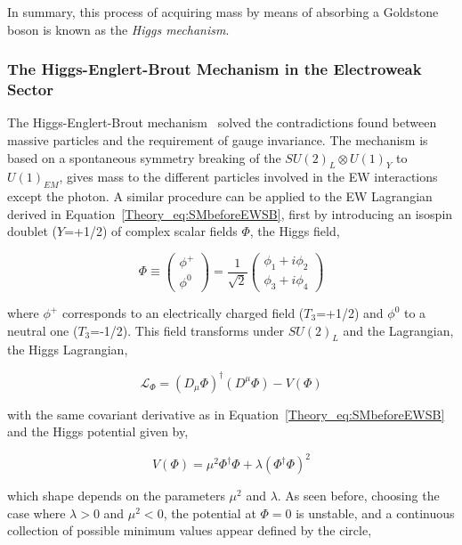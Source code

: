 In summary, this process of acquiring mass by means of absorbing a Goldstone boson is known as the \textit{Higgs mechanism}.

\subsubsection{The Higgs-Englert-Brout Mechanism in the Electroweak Sector}

The Higgs-Englert-Brout mechanism~\cite{Higgs1,Higgs2,Englert} solved the contradictions found between massive particles and
the requirement of gauge invariance. The mechanism is based on a spontaneous symmetry breaking of the $SU(2)_L\otimes U(1)_Y$ to $U(1)_{EM}$,
gives mass to the different particles involved in the \acrshort{EW} interactions except the photon.
A similar procedure can be applied to the EW Lagrangian derived in Equation~\ref{Theory_eq:SMbeforeEWSB},
first by introducing an isospin doublet ($Y$=+1/2) of complex scalar fields $\Phi$, the Higgs field,

\begin{equation}
    \Phi\equiv
    \begin{pmatrix} \phi^+ \\ \phi^0 \end{pmatrix}
    =\frac{1}{\sqrt{2}}
    \begin{pmatrix} \phi_1 + i\phi_2 \\ \phi_3 + i\phi_4 \end{pmatrix}
\end{equation}

where $\phi^+$ corresponds to an electrically charged field ($T_3$=+1/2) and $\phi^0$ to a neutral one ($T_3$=-1/2).
This field transforms under $SU(2)_L$ and the Lagrangian, the Higgs Lagrangian,

\begin{equation}
    \mathcal{L}_\Phi = (D_\mu\Phi)^\dag(D^\mu\Phi)-V(\Phi)
\end{equation}

with the same covariant derivative as in Equation~\ref{Theory_eq:SMbeforeEWSB} and the Higgs potential given by,

\begin{equation}
    V(\Phi) = \mu^2\Phi^\dag\Phi+\lambda(\Phi^\dag\Phi)^2
\end{equation}

which shape depends on the parameters $\mu^2$ and $\lambda$. As seen before, choosing the case where $\lambda>0$ and $\mu^2<0$,
the potential at $\Phi=0$ is unstable, and a continuous collection of possible minimum values appear defined by the circle,

